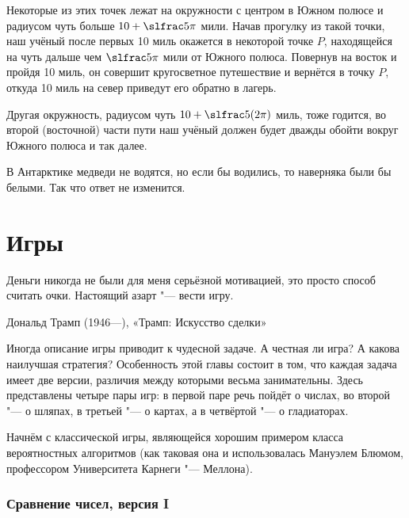 \documentclass[twoside]{book}
\makeatletter
\newcommand{\rindex}[2][\imki@jobname]{%
  \index[#1]{\detokenize{#2}}%
}
\makeatother
\begin{document}
Некоторые из этих точек лежат на окружности с центром в Южном полюсе и радиусом чуть больше $10 + \slfrac5\pi$ мили.
Начав прогулку из такой точки, наш учёный после первых 10 миль окажется в некоторой точке $P$, 
находящейся на чуть дальше чем $\slfrac5\pi$ мили от Южного полюса.
Повернув на восток и пройдя 10 миль, он совершит кругосветное путешествие и вернётся в точку $P$, откуда 10 миль на север приведут его обратно в лагерь.

Другая окружность, радиусом чуть  $10 + \slfrac5{(2\pi)}$ миль, тоже годится, во второй (восточной) части пути наш учёный должен будет дважды обойти вокруг Южного полюса и так далее.

В Антарктике медведи не водятся, но если бы водились, то наверняка были бы белыми.
Так что ответ не изменится.\heart


\chapter{Игры}

\setlength{\epigraphwidth}{.66\textwidth}
\epigraph{Деньги никогда не были для меня серьёзной мотивацией, это просто способ считать очки.
Настоящий азарт "--- вести игру.\vspace{1ex}}{Дональд Трамп (1946---),
«Трамп: Искусство сделки»}

Иногда  описание игры приводит к чудесной задаче.
А честная ли игра? А какова наилучшая стратегия? Особенность этой главы состоит в том, что каждая задача имеет две версии, различия между которыми весьма занимательны.
Здесь представлены четыре пары игр: в первой паре речь пойдёт о числах, во второй "--- о шляпах, в третьей "--- о картах, а в четвёртой "--- о гладиаторах.

\medskip

Начнём с классической игры, являющейся  хорошим примером класса вероятностных алгоритмов (как таковая она и использовалась Мануэлем Блюмом,  профессором Университета Карнеги "--- Меллона). %

\subsection*{Сравнение чисел, версия I} %
\rindex{Сравнение чисел, версия I}
\end{document}
